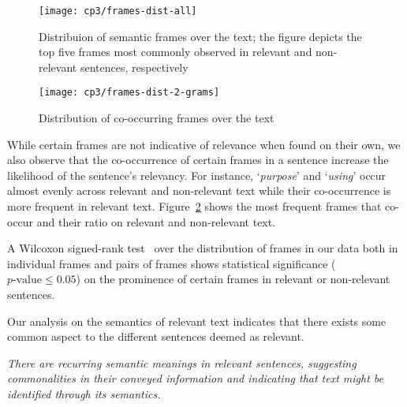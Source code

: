 \begin{figure}
\centering
\texttt{[image: cp3/frames-dist-all]}
\caption{Distribuion of semantic frames over the text; the figure depicts the top five frames most commonly observed in relevant and non-relevant sentences, respectively}
\label{fig:frame-distribution}
\end{figure}


\begin{figure}
\centering
\texttt{[image: cp3/frames-dist-2-grams]}
\caption{Distribution of co-occurring frames over the text}
\label{fig:frame-co-occurrence}
\end{figure}


While certain frames are not indicative of relevance when found on their own, we also observe that the co-occurrence of certain frames in a sentence increase the likelihood of the sentence's relevancy.
For instance, `\textit{purpose}' and `\textit{using}' occur almost evenly across relevant and non-relevant text
while their co-occurrence is more frequent in relevant text. 
Figure~\ref{fig:frame-co-occurrence} shows the most frequent frames that co-occur and their ratio on relevant and non-relevant text.


A Wilcoxon signed-rank test~\cite{wohlin2012} over the distribution of frames in our data both in individual frames and pairs of frames shows statistical significance ($p\text{-value} \le 0.05$) 
on the prominence of certain frames in relevant or non-relevant sentences.







Our analysis on the semantics of relevant text indicates that there exists some common aspect to the different sentences deemed as relevant.






\medskip
\begin{bluequote}
    \textit{There are recurring semantic meanings in relevant sentences,
    suggesting commonalities in their conveyed information
    and indicating that text might be identified through its semantics.}
\end{bluequote}



















    

